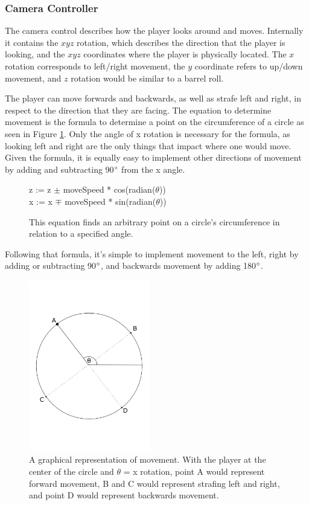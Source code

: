 \documentclass{article}
\begin{document}
\subsubsection{Camera Controller} \label{subsubsec:camera}

The camera control describes how the player looks around and moves. Internally it contains the $xyz$ rotation, which describes the direction that the player is looking, and the $xyz$ coordinates where the player is physically located. The $x$ rotation corresponds to left/right movement, the $y$ coordinate refers to up/down movement, and $z$ rotation would be similar to a barrel roll.

The player can move forwards and backwards, as well as strafe left and right, in respect to the direction that they are facing. The equation to determine movement is the formula to determine a point on the circumference of a circle as seen in Figure \ref{fig:circumference}. Only the angle of x rotation is necessary for the formula, as looking left and right are the only things that impact where one would move. Given the formula, it is equally easy to implement other directions of movement by adding and subtracting 90$\degree$ from the x angle.

\begin{figure}[H]
\centering
z := z $\pm$ moveSpeed * cos(radian($\theta$)) \\ 
x := x $\mp$ moveSpeed * sin(radian($\theta$))

\caption{This equation finds an arbitrary point on a circle's circumference in relation to a specified angle. \cite{Deyoso} }
\label{fig:circumference}
\end{figure}
Following that formula, it's simple to implement movement to the left, right by adding or subtracting 90$\degree$, and backwards movement by adding 180$\degree$.

\begin{figure}[H]
\centering
\includegraphics[width=200px]{circle}
\caption{A graphical representation of movement. With the player at the center of the circle and $\theta$ = x rotation, point A would represent forward movement, B and C would represent strafing left and right, and point D would represent backwards movement.}
\label{fig:circle}
\end{figure}
\end{document}
